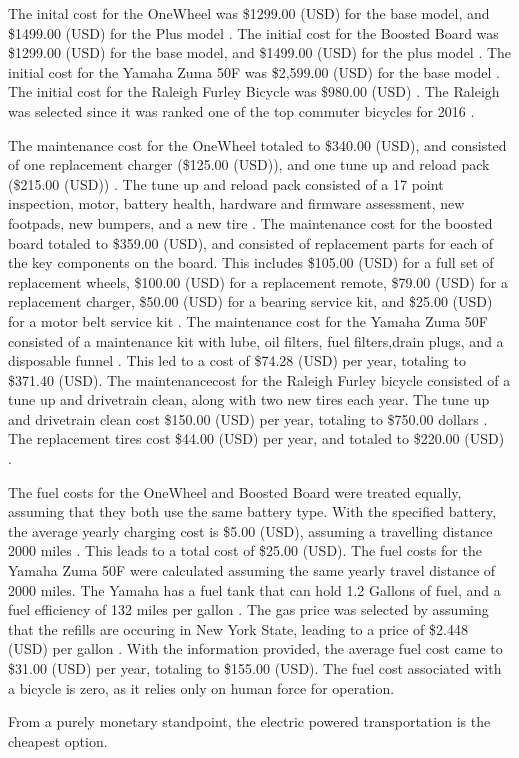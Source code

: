 The inital cost for the OneWheel was \$1299.00 (USD) for the base model, and \$1499.00 (USD) for the Plus model \cite{wheelcost}.	
The initial cost for the Boosted Board was \$1299.00 (USD) for the base model, and \$1499.00 (USD) for the plus model \cite{boardcost}.
The initial cost for the Yamaha Zuma 50F was \$2,599.00 (USD) for the base model \cite{Yamaha}.
The initial cost for the Raleigh Furley Bicycle was \$980.00 (USD) \cite{Raleigh}. 
The Raleigh was selected since it was ranked one of the top commuter bicycles for 2016 \cite{BikeMagazine}.
\par
The maintenance cost for the OneWheel totaled to \$340.00 (USD), and consisted of one replacement charger (\$125.00 (USD)), and one tune up and reload pack (\$215.00 (USD)) \cite{wheelcost}.
The tune up and reload pack consisted of a 17 point inspection, motor, battery health, hardware and firmware assessment, new footpads, new bumpers, and a new tire \cite{wheelcost}.
The maintenance cost for the boosted board totaled to \$359.00 (USD), and consisted of replacement parts for each of the key components on the board. This includes  \$105.00 (USD) for a full set of replacement wheels, \$100.00 (USD) for a replacement remote,  \$79.00 (USD) for a replacement charger, \$50.00 (USD) for a bearing service kit, and \$25.00 (USD) for a motor belt service kit \cite{boardcost}.
The maintenance cost for the Yamaha Zuma 50F consisted of a maintenance kit with lube, oil filters, fuel filters,drain plugs, and a disposable funnel \cite{YamahaMaintenance}. 
This led to a cost of \$74.28 (USD) per year, totaling to \$371.40 (USD).
The maintenancecost for the Raleigh Furley bicycle consisted of a tune up and drivetrain clean, along with two new tires each year. 
The tune up and drivetrain clean cost \$150.00 (USD) per year, totaling to \$750.00 dollars \cite{bikerepair}. 
The replacement tires cost \$44.00 (USD) per year, and totaled to \$220.00 (USD) \cite{CanadianTire}.
\par
The fuel costs for the OneWheel and Boosted Board were treated equally, assuming that they both use the same battery type. With the specified battery, the average yearly charging cost is \$5.00 (USD), assuming a travelling distance 2000 miles \cite{boostedkickstart}. 
This leads to a total cost of \$25.00 (USD).
The fuel costs for the Yamaha Zuma 50F were calculated assuming the same yearly travel distance of 2000 miles.
The Yamaha has a fuel tank that can hold 1.2 Gallons of fuel, and a fuel efficiency of 132 miles per gallon \cite{Yamaha}.
The gas price was selected by assuming that the refills are occuring in New York State, leading to a price of \$2.448 (USD) per gallon \cite{gasprice}.
With the information provided, the average fuel cost came to \$31.00 (USD) per year, totaling to \$155.00 (USD).
The fuel cost associated with a bicycle is zero, as it relies only on human force for operation.
\par
From a purely monetary standpoint, the electric powered transportation is the cheapest option.

